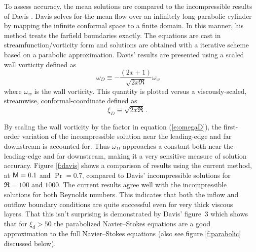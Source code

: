 To assess accuracy, the mean solutions are compared to the incompressible
results of Davis \cite{Davis:72}.  Davis solves for the mean flow over an
infinitely long parabolic cylinder by mapping the infinite conformal space to
a finite domain.  In this manner, his method treats the farfield boundaries
exactly.  The equations are cast in streamfunction/vorticity form and
solutions are obtained with a iterative scheme based on a parabolic
approximation.  Davis' results are presented using a scaled wall vorticity
defined as
%
\begin{equation} \label{e:omegaD}
  \omega_D \equiv  -\frac{(2 x + 1)}{\sqrt{2 x \Re}} \omega_w
\end{equation}
%
where $\omega_w$ is the wall vorticity.  This quantity is plotted versus a
viscously-scaled, streamwise, conformal-coordinate defined as
%
\begin{equation} 
  \xi_D \equiv \sqrt{2 x \Re} \period
\end{equation}

By scaling the wall vorticity by the factor in equation (\ref{e:omegaD}), the
first-order variation of the incompressible solution near the leading-edge and
far downstream is accounted for.  Thus $\omega_D$ approaches a constant both
near the leading-edge and far downstream, making it a very sensitive measure
of solution accuracy.  Figure \ref{f:davis} shows a comparison of results
using the current method, at ${\sf M}=0.1$ and $\Pr=0.7$, compared to Davis'
incompressible solutions for $\Re=100$ and $1000$.  The current results agree
well with the incompressible solutions for both Reynolds numbers.  This
indicates that both the inflow and outflow boundary conditions are quite
successful even for very thick viscous layers.  That this isn't surprising is
demonstrated by Davis' figure~3 which shows that for $\xi_d > 50$ the
parabolized Navier--Stokes equations are a good approximation to the full
Navier--Stokes equations (also see figure \ref{f:parabolic} discussed below).


%
%

